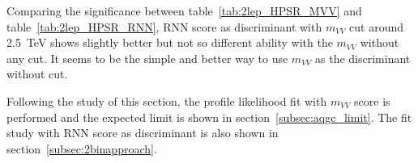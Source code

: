 \begin{table}[ht!]
\small
\begin{center}
\caption{Best cut point table for binned significance for RNN score distribution in \tlep channel LPSR}
\label{tab:2lep_LPSR_RNN}
\end{center}
\end{table}

Comparing the significance between table~\ref{tab:2lep_HPSR_MVV} and table~\ref{tab:2lep_HPSR_RNN}, 
RNN score as discriminant with $m_{VV}$ cut around 2.5~TeV shows slightly better but not so different ability with the $m_{VV}$ without any cut.
It seems to be the simple and better way to use $m_{VV}$ as the discriminant without cut. 

Following the study of this section, the profile likelihood fit with $m_{VV}$ score is performed and the expected limit is shown in section~\ref{subsec:aqgc_limit}. The fit study with RNN score as discriminant is also shown in section~\ref{subsec:2binapproach}.


